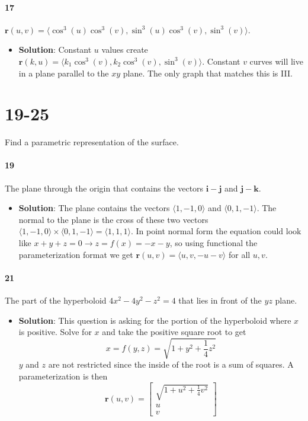 \documentclass{article}
\begin{document}
    \paragraph{17} $\mathbf{r}(u,v) = \langle \cos^3(u)\cos^3(v), \sin^3(u)\cos^3(v), \sin^3(v) \rangle$. 
    \begin{itemize}
        \item \textbf{Solution}: Constant $u$ values create $\mathbf{r}(k,u) = \langle k_1\cos^3(v), k_2\cos^3(v), \sin^3(v) \rangle$. Constant $v$ curves will live in a plane parallel to the $xy$ plane. The only graph that matches this is III.
    \end{itemize}
    
    \section*{19-25} Find a parametric representation of the surface.
    \paragraph{19} The plane through the origin that contains the vectors $\mathbf{i-j}$ and $\mathbf{j-k}$.
    \begin{itemize}
        \item \textbf{Solution}: The plane contains the vectors $\langle 1, -1, 0 \rangle$ and $\langle 0, 1, -1 \rangle$. The normal to the plane is the cross of these two vectors $\langle 1, -1, 0 \rangle \times \langle 0, 1, -1 \rangle = \langle 1,1,1 \rangle$. In point normal form the equation could look like $x+y+z=0 \longrightarrow z = f(x)=-x-y$, so using functional the parameterization format we get $\mathbf{r}(u,v) = \langle u,v, -u-v \rangle$ for all $u,v$.
    \end{itemize}
    
    \paragraph{21} The part of the hyperboloid $4x^2-4y^2-z^2=4$ that lies in front of the $yz$ plane.
    \begin{itemize}
        \item \textbf{Solution}: This question is asking for the portion of the hyperboloid where $x$ is positive. Solve for $x$ and take the positive square root to get
        \[ x = f(y,z) = \sqrt{1+y^2+\frac{1}{4}z^2} \]
        $y$ and $z$ are not restricted since the inside of the root is a sum of squares. A parameterization is then
        \[ \mathbf{r}(u,v) = \begin{bmatrix} \sqrt{1+u^2+\frac{1}{4}v^2}\\u\\v \end{bmatrix} \]
    \end{itemize}
    
\end{document}
